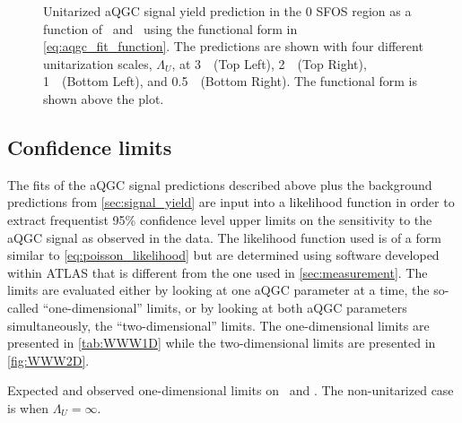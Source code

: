 \begin{figure}[tb]
\caption{Unitarized aQGC signal yield prediction in the 0 SFOS region
as a function of \fszero~and \fsone~using the functional
form in \eqn\eqref{eq:aqgc_fit_function}. 
The predictions are shown with four different unitarization scales, $\Lambda_U$,
at 3~\TeV~(Top Left),
2~\TeV~(Top Right), 1~\TeV~(Bottom Left), and 0.5~\TeV~(Bottom Right).
The functional form is shown
above the plot.}
\label{fig:aqgc_fit_0sfos_unit}
\end{figure}

\subsection{Confidence limits}

The fits of the aQGC signal predictions described above plus the background predictions
from \sec\ref{sec:signal_yield} are input into a likelihood function
in order to extract frequentist 95\% confidence level upper limits on the 
sensitivity to the aQGC signal as observed in the data.
The likelihood function used is of a form similar to \eqn\eqref{eq:poisson_likelihood}
but are determined using software developed within ATLAS \cite{tgclim} that is different
from the one used in \sec\ref{sec:measurement}.
The limits are evaluated either by looking at one aQGC 
parameter at a time, the so-called ``one-dimensional''
limits, or by looking at both aQGC parameters simultaneously, the 
``two-dimensional'' limits. The one-dimensional limits
are presented in \tab\ref{tab:WWW1D}
while the two-dimensional limits are presented in 
\fig\ref{fig:WWW2D}.
  
 
 \begin{table}
   \begin{center}
   
     \caption{Expected and observed one-dimensional limits on \fszero~and \fsone.
     The non-unitarized case is when $\Lambda_U=\infty$.}
     \label{tab:WWW1D}

   \end{center}
 \end{table}
 
